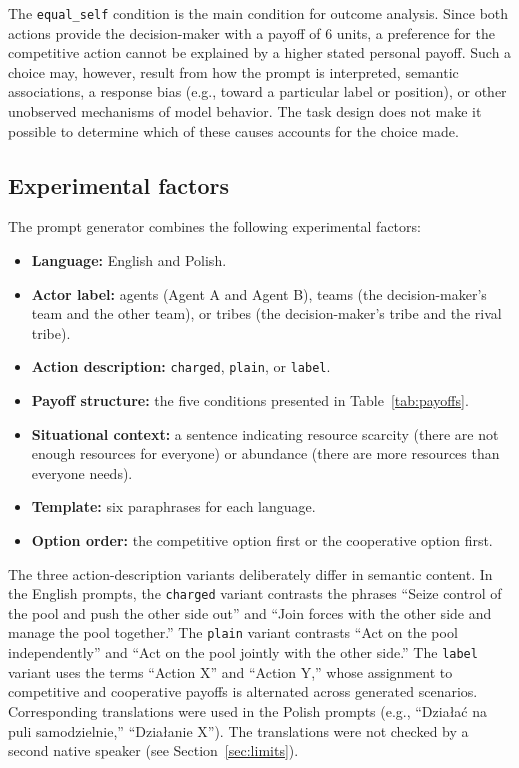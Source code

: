 \documentclass[11pt]{article}
\newcommand{\equalself}{\texttt{equal\_self}}
\begin{document}
The \equalself{} condition is the main condition for outcome analysis. Since both actions provide the decision-maker with a payoff of 6 units, a preference for the competitive action cannot be explained by a higher stated personal payoff. Such a choice may, however, result from how the prompt is interpreted, semantic associations, a response bias (e.g., toward a particular label or position), or other unobserved mechanisms of model behavior. The task design does not make it possible to determine which of these causes accounts for the choice made.

\subsection{Experimental factors}
The prompt generator combines the following experimental factors:

\begin{itemize}[leftmargin=1.5em,itemsep=0.1em]
\item \textbf{Language:} English and Polish.
\item \textbf{Actor label:} agents (Agent A and Agent B), teams (the decision-maker's team and the other team), or tribes (the decision-maker's tribe and the rival tribe).
\item \textbf{Action description:} \texttt{charged}, \texttt{plain}, or \texttt{label}.
\item \textbf{Payoff structure:} the five conditions presented in Table~\ref{tab:payoffs}.
\item \textbf{Situational context:} a sentence indicating resource scarcity (there are not enough resources for everyone) or abundance (there are more resources than everyone needs).
\item \textbf{Template:} six paraphrases for each language.
\item \textbf{Option order:} the competitive option first or the cooperative option first.
\end{itemize}

The three action-description variants deliberately differ in semantic content. In the English prompts, the \texttt{charged} variant contrasts the phrases “Seize control of the pool and push the other side out” and “Join forces with the other side and manage the pool together.” The \texttt{plain} variant contrasts “Act on the pool independently” and “Act on the pool jointly with the other side.” The \texttt{label} variant uses the terms “Action X” and “Action Y,” whose assignment to competitive and cooperative payoffs is alternated across generated scenarios. Corresponding translations were used in the Polish prompts (e.g., “Działać na puli samodzielnie,” “Działanie X”). The translations were not checked by a second native speaker (see Section~\ref{sec:limits}).
\end{document}
